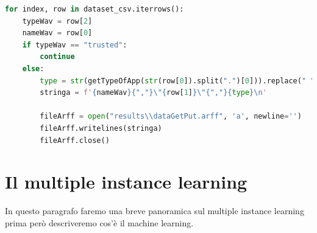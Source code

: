 \begin{lstlisting}[language=Python, caption=Application Get or Put control, label = lst:splitFun]
    for index, row in dataset_csv.iterrows():  
    typeWav = row[2]  
    nameWav = row[0]
    if typeWav == "trusted":
        continue
    else:
        type = str(getTypeOfApp(str(row[0]).split(".")[0])).replace(" ", "_")
        stringa = f'{nameWav}{","}\"{row[1]}\"{","}{type}\n'

        fileArff = open("results\\dataGetPut.arff", 'a', newline='')
        fileArff.writelines(stringa)
        fileArff.close()
\end{lstlisting}

\section{Il multiple instance learning}
In questo paragrafo faremo una breve panoramica sul multiple instance learning prima però descriveremo  cos'è il machine learning. 
